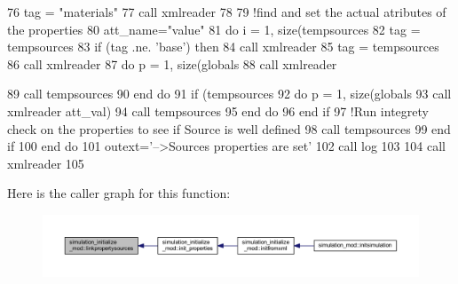 \begin{DoxyCode}
76     tag = \textcolor{stringliteral}{"materials"}
77     \textcolor{keyword}{call }xmlreader%
78 
79     \textcolor{comment}{!find and set the actual atributes of the properties}
80     att\_name=\textcolor{stringliteral}{"value"}
81     \textcolor{keywordflow}{do} i = 1, \textcolor{keyword}{size}(tempsources%
82         tag = tempsources%
83         \textcolor{keywordflow}{if} (tag .ne. \textcolor{stringliteral}{'base'}) \textcolor{keywordflow}{then}
84         \textcolor{keyword}{call }xmlreader%
85         tag = tempsources%
86         \textcolor{keyword}{call }xmlreader%
87         \textcolor{keywordflow}{do} p = 1, \textcolor{keyword}{size}(globals%
88             \textcolor{keyword}{call }xmlreader%
         
89             \textcolor{keyword}{call }tempsources%
90 \textcolor{keywordflow}{        end do}
91         \textcolor{keywordflow}{if} (tempsources%
92             \textcolor{keywordflow}{do} p = 1, \textcolor{keyword}{size}(globals%
93                 \textcolor{keyword}{call }xmlreader%
      att\_val)
94                 \textcolor{keyword}{call }tempsources%
95 \textcolor{keywordflow}{            end do}
96 \textcolor{keywordflow}{        end if}
97         \textcolor{comment}{!Run integrety check on the properties to see if Source is well defined}
98         \textcolor{keyword}{call }tempsources%
99 \textcolor{keywordflow}{        end if}
100 \textcolor{keywordflow}{    end do}
101     outext=\textcolor{stringliteral}{'-->Sources properties are set'}
102     \textcolor{keyword}{call }log%
103     
104     \textcolor{keyword}{call }xmlreader%
105 
\end{DoxyCode}
Here is the caller graph for this function\+:
\nopagebreak
\begin{figure}[H]
\begin{center}
\leavevmode
\includegraphics[width=350pt]{namespacesimulation__initialize__mod_a695ed61242e902d50bc40b83a6d11f65_icgraph}
\end{center}
\end{figure}
